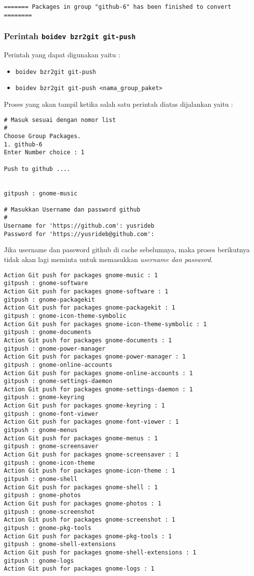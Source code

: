 {\begin{lstlisting}[language=ShellBash2]
======= Packages in group "github-6" has been finished to convert ========
\end{lstlisting}

\subsubsection{Perintah {\small \texttt{boidev bzr2git git-push}}}
\noindent
Perintah yang dapat digunakan yaitu :
\begin{itemize}
	\item {\small \texttt{boidev bzr2git git-push}}
	\item {\small \texttt{boidev bzr2git git-push <nama\_group\_paket>}}
\end{itemize}

\noindent
Proses yang akan tampil ketika salah satu perintah diatas dijalankan yaitu :

\begin{lstlisting}[language=ShellBash2]
# Masuk sesuai dengan nomor list
#
Choose Group Packages.
1. github-6
Enter Number choice : 1

Push to github .... 


gitpush : gnome-music

# Masukkan Username dan password github
#
Username for 'https://github.com': yusrideb
Password for 'https://yusrideb@github.com': 

\end{lstlisting}

\noindent
Jika username dan password github di cache sebelumnya, maka proses berikutnya tidak akan lagi meminta untuk memasukkan \textit{username dan password}.

\begin{lstlisting}[language=ShellBash2]
Action Git push for packages gnome-music : 1 
gitpush : gnome-software
Action Git push for packages gnome-software : 1 
gitpush : gnome-packagekit
Action Git push for packages gnome-packagekit : 1 
gitpush : gnome-icon-theme-symbolic
Action Git push for packages gnome-icon-theme-symbolic : 1 
gitpush : gnome-documents
Action Git push for packages gnome-documents : 1 
gitpush : gnome-power-manager
Action Git push for packages gnome-power-manager : 1 
gitpush : gnome-online-accounts
Action Git push for packages gnome-online-accounts : 1 
gitpush : gnome-settings-daemon
Action Git push for packages gnome-settings-daemon : 1 
gitpush : gnome-keyring
Action Git push for packages gnome-keyring : 1 
gitpush : gnome-font-viewer
Action Git push for packages gnome-font-viewer : 1 
gitpush : gnome-menus
Action Git push for packages gnome-menus : 1 
gitpush : gnome-screensaver
Action Git push for packages gnome-screensaver : 1 
gitpush : gnome-icon-theme
Action Git push for packages gnome-icon-theme : 1 
gitpush : gnome-shell
Action Git push for packages gnome-shell : 1 
gitpush : gnome-photos
Action Git push for packages gnome-photos : 1 
gitpush : gnome-screenshot
Action Git push for packages gnome-screenshot : 1 
gitpush : gnome-pkg-tools
Action Git push for packages gnome-pkg-tools : 1 
gitpush : gnome-shell-extensions
Action Git push for packages gnome-shell-extensions : 1 
gitpush : gnome-logs
Action Git push for packages gnome-logs : 1 


\end{lstlisting}}
